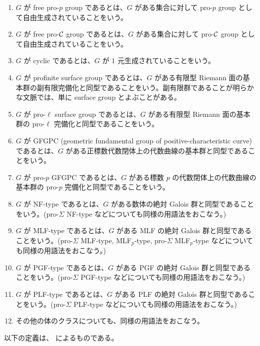 \begin{defn}
\begin{enumerate}
    \item $G$ が free pro-$p$ group であるとは、$G$ がある集合に対して pro-$p$ group として自由生成されていることをいう。
    \item $G$ が free pro-$\mathcal{C}$ group であるとは、$G$ がある集合に対して pro-$\mathcal{C}$ group として自由生成されていることをいう。
    \item $G$ が cyclic であるとは、$G$ が $1$ 元生成されていることをいう。
    \item $G$ が profinite surface group であるとは、$G$ がある有限型 Riemann 面の基本群の副有限完備化と同型であることをいう。副有限群であることが明らかな文脈では、単に surface group とよぶことがある。
    \item $G$ が pro-$\ell$ surface group であるとは、$G$ がある有限型 Riemann 面の基本群の pro-$\ell$ 完備化と同型であることをいう。
    \item $G$ が GFGPC (geometric fundamental group of positive-characteristic curve) であるとは、$G$ がある正標数代数閉体上の代数曲線の基本群と同型であることをいう。
    \item $G$ が pro-$p$ GFGPC であるとは、$G$ がある標数 $p$ の代数閉体上の代数曲線の基本群の pro-$p$ 完備化と同型であることをいう。
    \item $G$ が NF-type であるとは、$G$ がある数体の絶対 Galois 群と同型であることをいう。(pro-$\Sigma$ NF-type などについても同様の用語法をおこなう。)
    \item $G$ が MLF-type であるとは、$G$ がある MLF の絶対 Galois 群と同型であることをいう。(pro-$\Sigma$ MLF-type, MLF$_p$-type, pro-$\Sigma$ MLF$_p$-type などについても同様の用語法をおこなう。)
    \item $G$ が PGF-type であるとは、$G$ がある PGF の絶対 Galois 群と同型であることをいう。(pro-$\Sigma$ PGF-type などについても同様の用語法をおこなう。)
    \item $G$ が PLF-type であるとは、$G$ がある PLF の絶対 Galois 群と同型であることをいう。(pro-$\Sigma$ PLF-type などについても同様の用語法をおこなう。)
    \item その他の体のクラスについても、同様の用語法をおこなう。
  \end{enumerate}
\end{defn}

以下の定義は、\cite{GeneralAnabGroupProp} によるものである。

